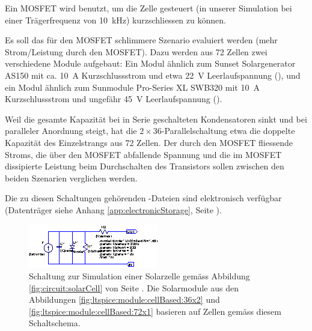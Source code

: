 Ein MOSFET  wird benutzt, um  die Zelle  gesteuert (in unserer  Simulation bei
einer Tr\"agerfrequenz von \SI{10}{\kilo\hertz}) kurzschliessen zu k\"onnen.

Es    soll   das    f\"ur   den    MOSFET   schlimmere    Szenario   evaluiert
werden   (mehr    Strom/Leistung   durch    den   MOSFET). Dazu
werden   aus  72   Zellen  zwei   verschiedene  Module   aufgebaut: Ein  Modul
\"ahnlich    zum    Sunset   Solargenerator    AS150    \cite{ref:solar:as150}
mit    ca. \SI{10}{\ampere}   Kurzschlussstrom    und   etwa    \SI{22}{\volt}
Leerlaufspannung  (),  und  ein  Modul
\"ahnlich  zum Sunmodule  Pro-Series  XL SWB320  \cite{ref:solar:sunmodulePro}
mit   \SI{10}{\ampere}   Kurzschlussstrom    und   ungef\"ahr   \SI{45}{\volt}
Leerlaufspannung ().

Weil die gesamte Kapazit\"at bei in Serie geschalteten Kondensatoren sinkt und
bei  paralleler  Anordnung steigt,  hat  die  $2 \times  36$-Parallelschaltung
 etwa die doppelte Kapazit\"at des Einzelstrangs
aus 72 Zellen. Der  durch den MOSFET fliessende Stroms, die  \"uber den MOSFET
abfallende Spannung und die im  MOSFET dissipierte Leistung beim Durchschalten
des Transistors sollen zwischen den beiden Szenarien verglichen werden.

Die zu  diesen Schaltungen geh\"orenden -Dateien  sind elektronisch
verf\"ugbar  (Datentr\"ager  siehe Anhang  \ref{app:electronicStorage},  Seite
\pageref{app:electronicStorage}).

\begin{figure}[h!tb]
    \centering
    \includegraphics[width=\textwidth]{images/ltspice/singlecell.eps}
    \caption{%
        Schaltung        zur         Simulation        einer        Solarzelle
        gem\"ass        Abbildung       \ref{fig:circuit:solarCell}        von
        Seite     \pageref{fig:circuit:solarCell}. Die     Solarmodule     aus
        den     Abbildungen    \ref{fig:ltspice:module:cellBased:36x2}     und
        \ref{fig:ltspice:module:cellBased:72x1}  basieren auf  Zellen gem\"ass
        diesem Schaltschema.%
    }
    \label{fig:ltspice:solarCell}
\end{figure}

